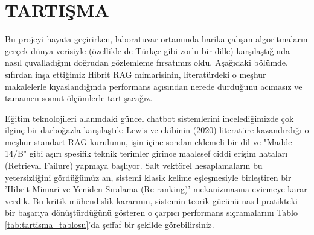 \documentclass[12pt,a4paper]{report}
\begin{document}
\chapter{TARTIŞMA}

Bu projeyi hayata geçirirken, laboratuvar ortamında harika çalışan algoritmaların gerçek dünya verisiyle (özellikle de Türkçe gibi zorlu bir dille) karşılaştığında nasıl çuvalladığını doğrudan gözlemleme fırsatımız oldu. Aşağıdaki bölümde, sıfırdan inşa ettiğimiz Hibrit RAG mimarisinin, literatürdeki o meşhur makalelerle kıyaslandığında performans açısından nerede durduğunu acımasız ve tamamen somut ölçümlerle tartışacağız.

Eğitim teknolojileri alanındaki güncel chatbot sistemlerini incelediğimizde çok ilginç bir darboğazla karşılaştık: Lewis ve ekibinin (2020) literatüre kazandırdığı o meşhur standart RAG kurulumu, işin içine sondan eklemeli bir dil ve "Madde 14/B" gibi aşırı spesifik teknik terimler girince maalesef ciddi erişim hataları (Retrieval Failure) yapmaya başlıyor. Salt vektörel hesaplamaların bu yetersizliğini gördüğümüz an, sistemi klasik kelime eşleşmesiyle birleştiren bir 'Hibrit Mimari ve Yeniden Sıralama (Re-ranking)' mekanizmasına evirmeye karar verdik. Bu kritik mühendislik kararının, sistemin teorik gücünü nasıl pratikteki bir başarıya dönüştürdüğünü gösteren o çarpıcı performans sıçramalarını Tablo \ref{tab:tartisma_tablosu}'da şeffaf bir şekilde görebilirsiniz.
\end{document}
